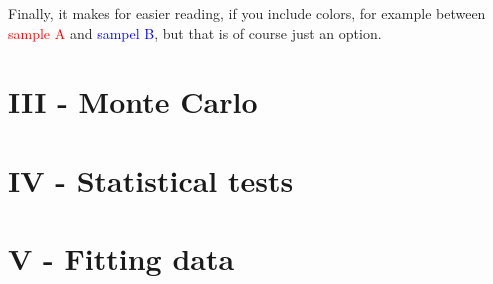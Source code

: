 \documentclass{article}
\begin{document}
Finally, it makes for easier reading, if you include colors, for example between \textcolor{red}{sample A} and \textcolor{blue}{sampel B}, but that is of course just an option.



\section*{III - Monte Carlo}

\section*{IV - Statistical tests}

\section*{V - Fitting data}



\end{document}
